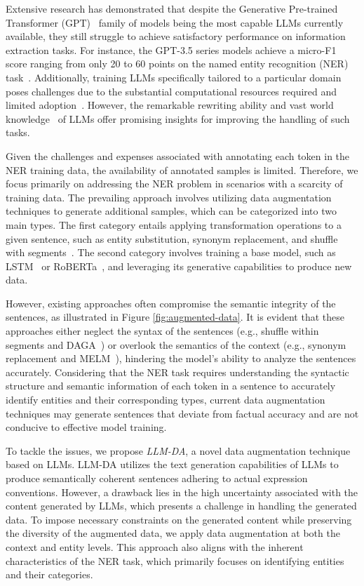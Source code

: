 \documentclass[11pt]{article}
\begin{document}
Extensive research has demonstrated that despite the Generative Pre-trained Transformer (GPT)~\cite{GPT} family of models being the most capable LLMs currently available, they still struggle to achieve satisfactory performance on information extraction tasks. 
For instance, the GPT-3.5 series models achieve a micro-F1 score ranging from only 20 to 60 points on the named entity recognition (NER) task~\cite{GPT-chen, GPT-ye}. 
Additionally, training LLMs specifically tailored to a particular domain poses challenges due to the substantial computational resources required and limited adoption~\cite{InstructUIE}. However, the remarkable rewriting ability and vast world knowledge~\cite{World-knowledge} of LLMs offer promising insights for improving the handling of such tasks.

Given the challenges and expenses associated with annotating each token in the NER training data, the availability of annotated samples is limited. Therefore, we focus primarily on addressing the NER problem in scenarios with a scarcity of training data.
The prevailing approach involves utilizing data augmentation techniques to generate additional samples, which can be categorized into two main types. The first category entails applying transformation operations to a given sentence, such as entity substitution, synonym replacement, and shuffle with segments~\cite{LSMS}. The second category involves training a base model, such as LSTM~\cite{LSTM} or RoBERTa~\cite{RoBERTa}, and leveraging its generative capabilities to produce new data.


However, existing approaches often compromise the semantic integrity of the sentences, as illustrated in Figure \ref{fig:augmented-data}.
It is evident that these approaches either neglect the syntax of the sentences (e.g., shuffle within segments and DAGA~\cite{DAGA}) or overlook the semantics of the context (e.g., synonym replacement and MELM~\cite{MELM}), hindering the model's ability to analyze the sentences accurately.
Considering that the NER task requires understanding the syntactic structure and semantic information of each token in a sentence to accurately identify entities and their corresponding types, current data augmentation techniques may generate sentences that deviate from factual accuracy and are not conducive to effective model training.


To tackle the issues, we propose \emph{LLM-DA}, a novel data augmentation technique based on LLMs. 
LLM-DA utilizes the text generation capabilities of LLMs to produce semantically coherent sentences adhering to actual expression conventions. However, a drawback lies in the high uncertainty associated with the content generated by LLMs, which presents a challenge in handling the generated data. 
To impose necessary constraints on the generated content while preserving the diversity of the augmented data, we apply data augmentation at both the context and entity levels. This approach also aligns with the inherent characteristics of the NER task, which primarily focuses on identifying entities and their categories.
\end{document}
